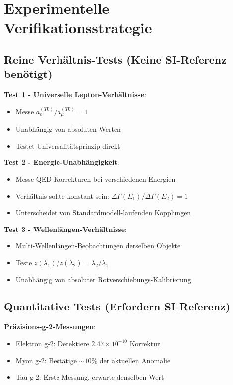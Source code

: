 	\section{Experimentelle Verifikationsstrategie}
	
	\subsection{Reine Verhältnis-Tests (Keine SI-Referenz benötigt)}
	
	\textbf{Test 1 - Universelle Lepton-Verhältnisse}:
	\begin{itemize}
		\item Messe $a_e^{(T0)}/a_{\mu}^{(T0)} = 1$
		\item Unabhängig von absoluten Werten
		\item Testet Universalitätsprinzip direkt
	\end{itemize}
	
	\textbf{Test 2 - Energie-Unabhängigkeit}:
	\begin{itemize}
		\item Messe QED-Korrekturen bei verschiedenen Energien
		\item Verhältnis sollte konstant sein: $\Delta\Gamma(E_1)/\Delta\Gamma(E_2) = 1$
		\item Unterscheidet von Standardmodell-laufenden Kopplungen
	\end{itemize}
	
	\textbf{Test 3 - Wellenlängen-Verhältnisse}:
	\begin{itemize}
		\item Multi-Wellenlängen-Beobachtungen derselben Objekte
		\item Teste $z(\lambda_1)/z(\lambda_2) = \lambda_2/\lambda_1$
		\item Unabhängig von absoluter Rotverschiebungs-Kalibrierung
	\end{itemize}
	
	\subsection{Quantitative Tests (Erfordern SI-Referenz)}
	
	\textbf{Präzisions-g-2-Messungen}:
	\begin{itemize}
		\item Elektron g-2: Detektiere $2.47 \times 10^{-10}$ Korrektur
		\item Myon g-2: Bestätige $\sim 10\%$ der aktuellen Anomalie
		\item Tau g-2: Erste Messung, erwarte denselben Wert
	\end{itemize}
	
